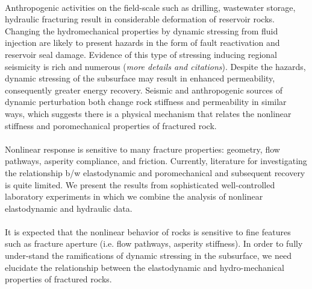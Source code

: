 \paragraph{} Anthropogenic activities on the field-scale such as drilling, wastewater storage, hydraulic fracturing result in considerable deformation of reservoir rocks. Changing the hydromechanical properties by dynamic stressing from fluid injection are likely to present hazards in the form of fault reactivation and reservoir seal damage. Evidence of this type of stressing inducing regional seismicity is rich and numerous (\textit{more details and citations}). Despite the hazards, dynamic stressing of the subsurface may result in enhanced permeability, consequently greater energy recovery. 
Seismic and anthropogenic sources of dynamic perturbation both change rock stiffness and permeability in similar ways, which suggests there is a physical mechanism that relates the nonlinear stiffness and poromechanical properties of fractured rock.

\paragraph{} Nonlinear response is sensitive to many fracture properties: geometry, flow pathways, asperity compliance, and friction. Currently, literature for investigating the relationship b/w elastodynamic and poromechanical and subsequent recovery is quite limited. We present the results from sophisticated well-controlled laboratory experiments in which we combine the analysis of nonlinear elastodynamic and hydraulic data. 

\paragraph{} It is expected that the nonlinear behavior of rocks is sensitive to fine features such as fracture aperture (i.e. flow pathways, asperity stiffness). In order to fully under-stand the ramifications of dynamic stressing in the subsurface, we need elucidate the relationship between the elastodynamic and hydro-mechanical properties of fractured rocks. 
